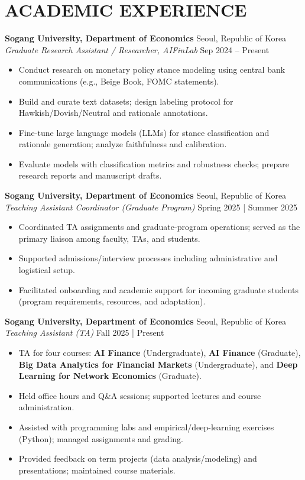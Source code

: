 \documentclass[a4paper,9pt]{extarticle}
\begin{document}
\section*{ACADEMIC EXPERIENCE}
\noindent \textbf{Sogang University, Department of Economics} \hfill Seoul, Republic of Korea\\
\textit{Graduate Research Assistant / Researcher, AIFinLab} \hfill Sep 2024 -- Present
\begin{itemize}
  \item Conduct research on monetary policy stance modeling using central bank communications (e.g., Beige Book, FOMC statements).
  \item Build and curate text datasets; design labeling protocol for Hawkish/Dovish/Neutral and rationale annotations.
  \item Fine-tune large language models (LLMs) for stance classification and rationale generation; analyze faithfulness and calibration.
  \item Evaluate models with classification metrics and robustness checks; prepare research reports and manuscript drafts.
\end{itemize}

\noindent
\textbf{Sogang University, Department of Economics} \hfill Seoul, Republic of Korea\\
\textit{Teaching Assistant Coordinator (Graduate Program)} \hfill Spring 2025 | Summer 2025
\begin{itemize}
  \item Coordinated TA assignments and graduate-program operations; served as the primary liaison among faculty, TAs, and students.
  \item Supported admissions/interview processes including administrative and logistical setup.
  \item Facilitated onboarding and academic support for incoming graduate students (program requirements, resources, and adaptation).
\end{itemize}

\noindent
\textbf{Sogang University, Department of Economics} \hfill Seoul, Republic of Korea\\
\textit{Teaching Assistant (TA)} \hfill Fall 2025 | Present
\begin{itemize}
  \item TA for four courses: \textbf{AI Finance} (Undergraduate), \textbf{AI Finance} (Graduate),
        \textbf{Big Data Analytics for Financial Markets} (Undergraduate),
        and \textbf{Deep Learning for Network Economics} (Graduate).
  \item Held office hours and Q\&A sessions; supported lectures and course administration.
  \item Assisted with programming labs and empirical/deep-learning exercises (Python); managed assignments and grading.
  \item Provided feedback on term projects (data analysis/modeling) and presentations; maintained course materials.
\end{itemize}
\end{document}
